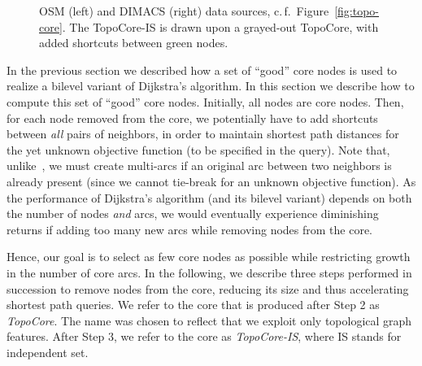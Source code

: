 \documentclass{sig-alternate}
\newcommand{\cf}{c.\,f.\xspace}
\begin{document}
\begin{figure}






\begin{centering}
\par\end{centering}

\caption{
OSM (left) and DIMACS (right) data sources, \cf~Figure~\ref{fig:topo-core}.
The TopoCore-IS is drawn upon a grayed-out TopoCore, with added shortcuts between green nodes.
}
\label{fig:topo-core-is}
\end{figure}


In the previous section we described how a set of ``good'' core nodes is
used to realize a bilevel variant of Dijkstra's algorithm. In this
section we describe how to compute this set of ``good'' core nodes.
Initially, all nodes are core nodes. 
Then, for each node removed from the core, we potentially have to add shortcuts between \emph{all} pairs of neighbors, in order to maintain shortest path distances for the yet unknown objective function (to be specified in the query). Note that, unlike~\cite{dsw-cch-sea-14}, we must create multi-arcs if an original arc between two neighbors is already present (since we cannot tie-break for an unknown objective function). As the performance of Dijkstra's algorithm (and its bilevel variant) depends on both the number of nodes \emph{and} arcs, we would eventually experience diminishing returns if adding too many new arcs while removing nodes from the core.

Hence, our goal is to select as few core nodes as possible while restricting growth in the number of core arcs.
In the following, we describe three steps performed in succession to remove
nodes from the core, reducing its size and thus accelerating shortest
path queries. We refer to the core that is produced after Step 2 as
\emph{TopoCore}. The name was chosen to reflect that we exploit only
topological graph features. After Step 3, we refer to the core as \emph{TopoCore-IS}, where IS stands for independent set. 
\end{document}
